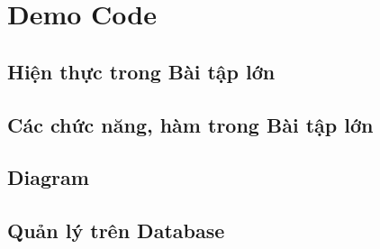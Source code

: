 \section{Demo Code}
\subsection*{Hiện thực trong Bài tập lớn}

\subsection{Các chức năng, hàm trong Bài tập lớn}
\subsection{Diagram}

\subsection{Quản lý trên Database}
